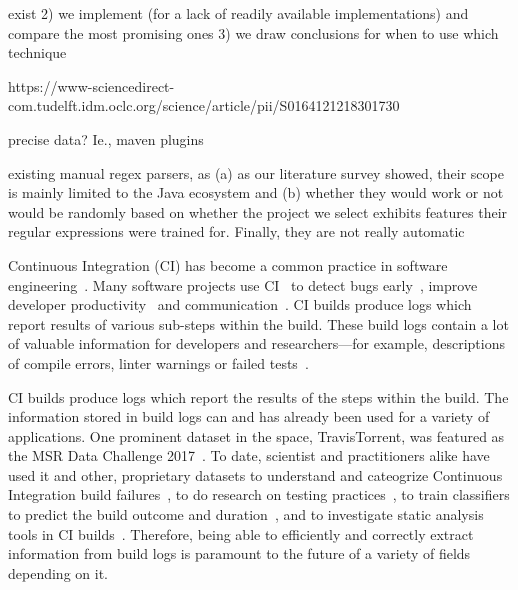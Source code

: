 exist 2) we implement (for a lack of readily available implementations)
and compare the most promising ones 3) we draw conclusions for when to
use which technique


https://www-sciencedirect-com.tudelft.idm.oclc.org/science/article/pii/S0164121218301730

precise data? Ie., maven plugins

existing manual regex parsers, as (a) as our literature survey showed,
their scope is mainly limited to the Java ecosystem and (b) whether
they would work or not would be randomly based on whether the project
we select exhibits features their regular expressions were trained for.
Finally, they are not really automatic


Continuous Integration (CI) has become a common practice in software
engineering~\cite{hilton2016usage}.
Many software projects use
CI~\cite{hilton2016usage,staahl2014modeling,beller2017oops} to detect
bugs early~\cite{vasilescu2015quality,duvall2007continuous}, improve
developer productivity~\cite{miller2008hundred,hilton2016usage} and
communication~\cite{downs2012ambient}.
CI builds produce logs which
report results of various sub-steps within the build.
These build logs
contain a lot of valuable information for developers and researchers---for
example, descriptions of compile errors, linter warnings or failed
tests~\cite{beller2017oops,seo2014programmers,vassallo2017a-tale}.

CI builds produce logs which report the results of the steps within
the build.
The information stored in build logs can and has
already been used for a variety of applications.
One prominent dataset
in the space, TravisTorrent, was featured as the MSR Data Challenge
2017~\cite{msr17challenge}.
To date, scientist and practitioners alike
have used it and other, proprietary datasets to understand and
cateogrize Continuous Integration build
failures~\cite{islam2017insights}, to do research on testing
practices~\cite{orellana2017differences}, to train classifiers to
predict the build outcome and
duration~\cite{ni2017cost,bisong2017built,machalica2019predictive},
and to investigate static analysis tools in CI
builds~\cite{zampetti2017open}.
Therefore, being able to efficiently
and correctly extract information from build logs is paramount to the
future of a variety of fields depending on it.

